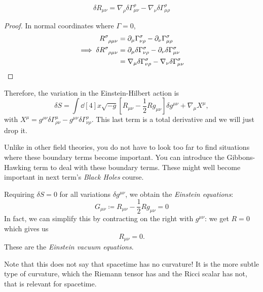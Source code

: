 \begin{claim}
  \begin{equation}
    \delta R_{\mu\nu} = \nabla_{\rho} \delta \Gamma^{\rho}_{\mu\nu} - \nabla_{\nu} \delta \Gamma^{\rho}_{\mu\rho}
  \end{equation}
\end{claim}
\begin{proof}
  In normal coordinates where $\Gamma = 0$,
  \begin{align}
    R \indices{^{\sigma}_{\rho\mu\nu}} &= \partial_{\mu} \Gamma^{\sigma}_{\nu\rho} - \partial_{\nu} \Gamma^{\sigma}_{\mu\rho} \\
   \implies \delta R \indices{^{\sigma}_{\rho\mu\nu}} &= \partial_{\mu} \delta \Gamma^{\sigma}_{\nu\rho} - \partial_{\nu} \delta \Gamma^{\sigma}_{\mu\nu} \\
   &= \nabla_{\mu} \delta\Gamma^{\sigma}_{\nu\rho} - \nabla_{\nu} \delta\Gamma^{\sigma}_{\mu\nu}
  \end{align}
\end{proof}

Therefore, the variation in the Einstein-Hilbert action is
\begin{equation}
  \delta S = \int \dd[4]{x} \sqrt{-g} \left[ R_{\mu\nu} - \frac{1}{2} R g_{\mu\nu} \right] \delta g^{\mu\nu} + \nabla_{\mu} X^{\mu},
\end{equation}
with $X^{\mu} = g^{\rho\nu} \delta\Gamma^{\mu}_{\rho\nu} - g^{\mu\nu} \delta \Gamma^{\rho}_{\nu\rho}$. This last term is a total derivative and we will just drop it.
\begin{leftbar}
  \begin{remark}
    Unlike in other field theories, you do not have to look too far to find situations where these boundary terms become important.
    You can introduce the Gibbons-Hawking term to deal with these boundary terms. These might well become important in next term's \emph{Black Holes} course.
  \end{remark}
\end{leftbar}
Requiring $\delta S = 0$ for all variations $\delta g^{\mu\nu}$, we obtain the \emph{Einstein equations}:
\begin{equation}
  G_{\mu\nu} \coloneqq R_{\mu\nu} - \frac{1}{2} R g_{\mu\nu} = 0
\end{equation}
In fact, we can simplify this by contracting on the right with $g^{\mu\nu}$: we get $R = 0$ which gives us
\begin{equation}
  R_{\mu\nu} = 0.
\end{equation}
These are the \emph{Einstein vacuum equations}.
\begin{leftbar}
  \begin{remark}
    Note that this does not say that spacetime has no curvature! It is the more subtle type of curvature, which the Riemann tensor has and the Ricci scalar has not, that is relevant for spacetime.
  \end{remark}
\end{leftbar}

